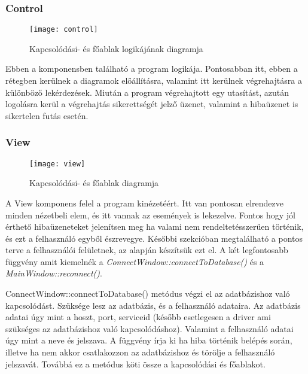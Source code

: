 \subsubsection{Control}

\begin{figure}[ht]
  \begin{center}
  \texttt{[image: control]}
  \end{center}
 \caption{ Kapcsolódási- és főablak logikájának diagramja}
\end{figure}

Ebben a komponensben található a program logikája. Pontosabban itt, ebben a rétegben kerülnek a diagramok előállításra, valamint
itt kerülnek végrehajtásra a különböző lekérdezések. Miután a program végrehajtott egy utasítást, azután logolásra kerül a végrehajtás sikerettségét
jelző üzenet, valamint a hibaüzenet is sikertelen futás esetén.

\subsubsection{View}

\begin{figure}[ht]
  \begin{center}
  \texttt{[image: view]}
  \end{center}
 \caption{Kapcsolódási- és főablak diagramja}
\end{figure}

A View komponens felel a program kinézetéért. Itt van pontosan elrendezve minden nézetbeli elem, és itt vannak az események is lekezelve.
Fontos hogy jól érthető hibaüzeneteket jelenítsen meg ha valami nem rendeltetésszerűen történik, és ezt a felhasználó egyből észrevegye.
Későbbi szekcióban megtalálható a pontos terve a felhasználói felületnek, az alapján készítsük ezt el. A két legfontosabb függvény amit kiemelnék
a \textit{ConnectWindow::connectToDatabase()} és a \textit{MainWindow::reconnect()}.

ConnectWindow::connectToDatabase() metódus végzi el az adatbázishoz való kapcsolódást. Szüksége lesz az adatbázis, és a felhasználó adataira.
Az adatbázis adatai úgy mint a hoszt, port, serviceid (később esetlegesen a driver ami szükséges az adatbázishoz való kapcsolódáshoz). Valamint a 
felhasználó adatai úgy mint a neve és jelszava. A függvény írja ki ha hiba történik belépés során, illetve ha nem akkor csatlakozzon az adatbázishoz
és törölje a felhasználó jelszavát. Továbbá ez a metódus köti össze a kapcsolódási és főablakot.

